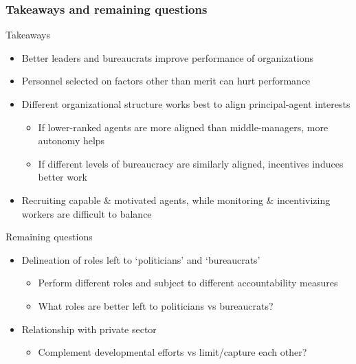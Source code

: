 \documentclass[aspectratio=169]{beamer}
\begin{document}
\begin{frame}
\frametitle{Takeaways and remaining questions} 
Takeaways
\begin{itemize}\setlength\itemsep{3pt}
\item Better leaders and bureaucrats improve performance of organizations
\item Personnel selected on factors other than merit can hurt performance
\item Different organizational structure works best to align principal-agent interests
\begin{itemize}\setlength\itemsep{3pt}
\item If lower-ranked agents are more aligned than middle-managers, more autonomy helps
\item If different levels of bureaucracy are similarly aligned, incentives induces better work
\end{itemize}
\item Recruiting capable \& motivated agents, while monitoring \& incentivizing workers are difficult to balance
\end{itemize}\medskip
Remaining questions
\begin{itemize}\setlength\itemsep{3pt}
\item Delineation of roles left to `politicians' and `bureaucrats'
\begin{itemize}\setlength\itemsep{3pt}
\item Perform different roles and subject to different accountability measures
\item What roles are better left to politicians vs bureaucrats?
\end{itemize}
\item Relationship with private sector
\begin{itemize}\setlength\itemsep{3pt}
\item Complement developmental efforts vs limit/capture each other?
\end{itemize}
\end{itemize}
\end{frame}


\end{document}
